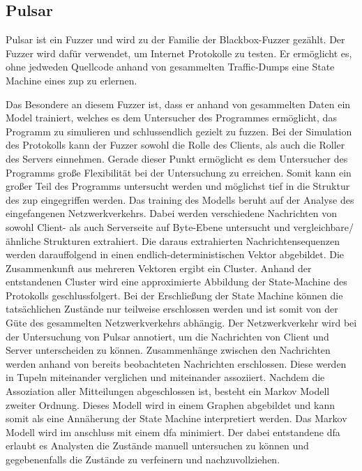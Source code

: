 
\subsection{Pulsar}\label{subsec:pulsar2}
Pulsar ist ein Fuzzer und wird zu der Familie der Blackbox-Fuzzer gezählt.
Der Fuzzer wird dafür verwendet, um Internet Protokolle zu testen.
Er ermöglicht es, ohne jedweden Quellcode anhand von gesammelten Traffic-Dumps eine State Machine eines \gls{zup} zu erlernen.

Das Besondere an diesem Fuzzer ist, dass er anhand von gesammelten Daten ein Model trainiert,
welches es dem Untersucher des Programmes ermöglicht, das Programm zu simulieren und schlussendlich
gezielt zu fuzzen.
Bei der Simulation des Protokolls kann der Fuzzer sowohl die Rolle des Clients, als auch die Roller
des Servers einnehmen.
Gerade dieser Punkt ermöglicht es dem Untersucher des Programms große Flexibilität bei der Untersuchung zu erreichen.
Somit kann ein großer Teil des Programms untersucht werden und möglichst tief in die Struktur des \gls{zup} eingegriffen werden.
\newline
\noindent Das training des Modells beruht auf der Analyse des eingefangenen Netzwerkverkehrs.
Dabei werden verschiedene Nachrichten von sowohl Client- als auch Serverseite auf Byte-Ebene untersucht und
vergleichbare/ähnliche Strukturen extrahiert.
Die daraus extrahierten Nachrichtensequenzen werden darauffolgend in einen endlich-deterministischen Vektor abgebildet.
Die Zusammenkunft aus mehreren Vektoren ergibt ein Cluster.
Anhand der entstandenen Cluster wird eine approximierte Abbildung der State-Machine des Protokolls geschlussfolgert.
Bei der Erschließung der State Machine können die tatsächlichen Zustände nur teilweise erschlossen werden und ist somit
von der Güte des gesammelten Netzwerkverkehrs abhängig.
Der Netzwerkverkehr wird bei der Untersuchung von Pulsar annotiert, um die Nachrichten von Client und Server unterscheiden
zu können.
Zusammenhänge zwischen den Nachrichten werden anhand von bereits beobachteten Nachrichten erschlossen.
Diese werden in Tupeln miteinander verglichen und miteinander assoziiert.
Nachdem die Assoziation aller Mitteilungen abgeschlossen ist, besteht ein Markov Modell zweiter Ordnung.
Dieses Modell wird in einem Graphen abgebildet und kann somit als eine Annäherung der State Machine interpretiert werden.
Das Markov Modell wird im anschluss mit einem \gls{dfa} minimiert.
Der dabei entstandene \gls{dfa} erlaubt es Analysten die Zustände manuell untersuchen zu können und gegebenenfalls
die Zustände zu verfeinern und nachzuvollziehen.